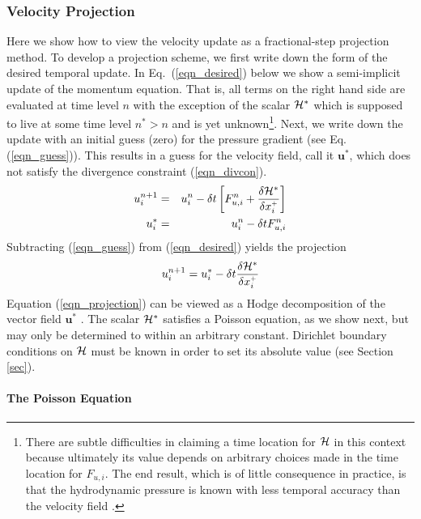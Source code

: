 \documentclass[11pt]{article}
\begin{document}
\subsubsection{Velocity Projection}

Here we show how to view the velocity update as a fractional-step projection method.  To develop a projection scheme, we first write down the form of the desired temporal update.  In Eq.~(\ref{eqn_desired}) below we show a semi-implicit update of the momentum equation.  That is, all terms on the right hand side are evaluated at time level $n$ with the exception of the scalar ${\cal H}^{*}$ which is supposed to live at some time level $n^* >n$ and is yet unknown\footnote[3]{There are subtle difficulties in claiming a time location for $\cal H$ in this context because ultimately its value depends on arbitrary choices made in the time location for $F_{u,i}$. The end result, which is of little consequence in practice, is that the hydrodynamic pressure is known with less temporal accuracy than the velocity field \cite{Almgren}.}.  Next, we write down the update with an initial guess (zero) for the pressure gradient (see Eq. (\ref{eqn_guess})).  This results in a guess for the velocity field, call it $\mathbf{u}^*$, which does not satisfy the divergence constraint (\ref{eqn_divcon}).
\begin{eqnarray}
\label{eqn_desired} u_i^{n+1} &=& u_i^n - \delta t \left[ F_{u,i}^n + \frac{\delta {\cal H}^{*}}{\delta x_i^{\scriptscriptstyle +}} \right] \\
\label{eqn_guess} u_i^* &=& u_i^n - \delta t F_{u,i}^n
\end{eqnarray}
Subtracting (\ref{eqn_guess}) from (\ref{eqn_desired}) yields the projection
\begin{equation}
\label{eqn_projection}
u_i^{n+1} = u_i^* - \delta t \frac{\delta {\cal H}^{*}}{\delta x_i^{\scriptscriptstyle +}}
\end{equation}
Equation (\ref{eqn_projection}) can be viewed as a Hodge decomposition of the vector field $\mathbf{u}^*$ \cite{Chorin}.  The scalar ${\cal H}^{*}$ satisfies a Poisson equation, as we show next, but may only be determined to within an arbitrary constant.  Dirichlet boundary conditions on ${\cal H}$ must be known in order to set its absolute value (see Section \ref{sec}).

\paragraph{The Poisson Equation}
\end{document}
